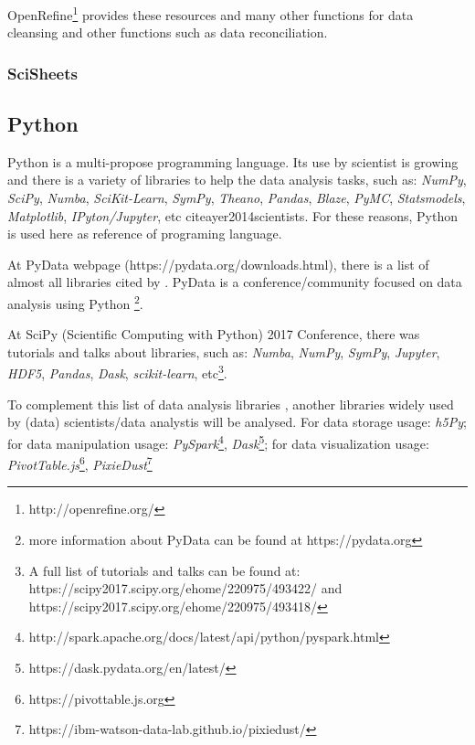 \documentclass[12pt,a4paper]{amsart}
\numberwithin{equation}{section}
\theoremstyle{plain}
\theoremstyle{definition}
\begin{document}
OpenRefine\footnote{http://openrefine.org/} provides these resources and many other functions for data cleansing and other functions such as data reconciliation.

\subsubsection{SciSheets}\label{scisheets}


\subsection{Python}\label{python}

Python is a multi-propose programming language. Its use by scientist is growing  and there is a variety of libraries to help the data analysis tasks, such as: \textit{NumPy}, \textit{SciPy}, \textit{Numba}, \textit{SciKit-Learn}, \textit{SymPy}, \textit{Theano}, \textit{Pandas}, \textit{Blaze}, \textit{PyMC}, \textit{Statsmodels}, \textit{Matplotlib}, \textit{IPyton/Jupyter}, etc cite{ayer2014scientists}. For these reasons, Python is used here as reference of programing language.

At PyData webpage (https://pydata.org/downloads.html), there is a list of almost all libraries cited by \cite{ayer2014scientists}. PyData is a conference/community focused on data analysis using Python \footnote{more information about PyData can be found at https://pydata.org}.

At SciPy (Scientific Computing with Python) 2017 Conference, there was tutorials and talks about libraries, such as: \textit{Numba}, \textit{NumPy}, \textit{SymPy}, \textit{Jupyter}, \textit{HDF5}, \textit{Pandas}, \textit{Dask}, \textit{scikit-learn}, etc\footnote{A full list of tutorials and talks can be found at: https://scipy2017.scipy.org/ehome/220975/493422/ and 
https://scipy2017.scipy.org/ehome/220975/493418/}.

To complement this list of data analysis libraries  \cite{ayer2014scientists}, another libraries widely used by (data) scientists/data analystis will be analysed. For data storage usage: \textit{h5Py}; for data manipulation usage: \textit{PySpark}\footnote{http://spark.apache.org/docs/latest/api/python/pyspark.html}, \textit{Dask}\footnote{https://dask.pydata.org/en/latest/}; for data visualization usage: \textit{PivotTable.js}\footnote{https://pivottable.js.org}, \textit{PixieDust}\footnote{https://ibm-watson-data-lab.github.io/pixiedust/}

\end{document}
